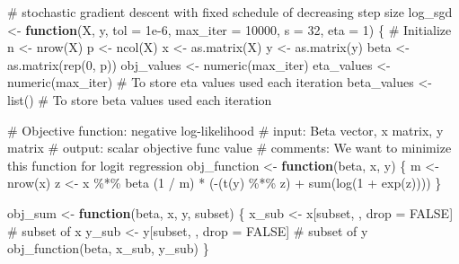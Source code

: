 \documentclass[
  letterpaper,
  DIV=11,
  numbers=noendperiod]{scrartcl}
\newenvironment{Shaded}{\begin{snugshade}}{\end{snugshade}}
\newcommand{\AttributeTok}[1]{\textcolor[rgb]{0.40,0.45,0.13}{#1}}
\newcommand{\CommentTok}[1]{\textcolor[rgb]{0.37,0.37,0.37}{#1}}
\newcommand{\ConstantTok}[1]{\textcolor[rgb]{0.56,0.35,0.01}{#1}}
\newcommand{\ControlFlowTok}[1]{\textcolor[rgb]{0.00,0.23,0.31}{\textbf{#1}}}
\newcommand{\DecValTok}[1]{\textcolor[rgb]{0.68,0.00,0.00}{#1}}
\newcommand{\FloatTok}[1]{\textcolor[rgb]{0.68,0.00,0.00}{#1}}
\newcommand{\FunctionTok}[1]{\textcolor[rgb]{0.28,0.35,0.67}{#1}}
\newcommand{\NormalTok}[1]{\textcolor[rgb]{0.00,0.23,0.31}{#1}}
\newcommand{\OtherTok}[1]{\textcolor[rgb]{0.00,0.23,0.31}{#1}}
\newcommand{\SpecialCharTok}[1]{\textcolor[rgb]{0.37,0.37,0.37}{#1}}
\begin{document}
\begin{Shaded}
\begin{Highlighting}[]
\CommentTok{\# stochastic gradient descent with fixed schedule of decreasing step size}
\NormalTok{log\_sgd }\OtherTok{\textless{}{-}} \ControlFlowTok{function}\NormalTok{(X, y, }\AttributeTok{tol =} \FloatTok{1e{-}6}\NormalTok{, }\AttributeTok{max\_iter =} \DecValTok{10000}\NormalTok{, }\AttributeTok{s =} \DecValTok{32}\NormalTok{, }\AttributeTok{eta =} \DecValTok{1}\NormalTok{) \{}
  \CommentTok{\# Initialize}
\NormalTok{  n }\OtherTok{\textless{}{-}} \FunctionTok{nrow}\NormalTok{(X)}
\NormalTok{  p }\OtherTok{\textless{}{-}} \FunctionTok{ncol}\NormalTok{(X)}
\NormalTok{  x }\OtherTok{\textless{}{-}} \FunctionTok{as.matrix}\NormalTok{(X)}
\NormalTok{  y }\OtherTok{\textless{}{-}} \FunctionTok{as.matrix}\NormalTok{(y)}
\NormalTok{  beta }\OtherTok{\textless{}{-}} \FunctionTok{as.matrix}\NormalTok{(}\FunctionTok{rep}\NormalTok{(}\DecValTok{0}\NormalTok{, p))}
\NormalTok{  obj\_values }\OtherTok{\textless{}{-}} \FunctionTok{numeric}\NormalTok{(max\_iter)}
\NormalTok{  eta\_values }\OtherTok{\textless{}{-}} \FunctionTok{numeric}\NormalTok{(max\_iter)  }\CommentTok{\# To store eta values used each iteration}
\NormalTok{  beta\_values }\OtherTok{\textless{}{-}} \FunctionTok{list}\NormalTok{() }\CommentTok{\# To store beta values used each iteration}
  
  \CommentTok{\# Objective function: negative log{-}likelihood}
  \CommentTok{\# input: Beta vector, x matrix, y matrix}
  \CommentTok{\# output: scalar objective func value}
  \CommentTok{\# comments: We want to minimize this function for logit regression}
\NormalTok{  obj\_function }\OtherTok{\textless{}{-}} \ControlFlowTok{function}\NormalTok{(beta, x, y) \{}
\NormalTok{    m }\OtherTok{\textless{}{-}} \FunctionTok{nrow}\NormalTok{(x)}
\NormalTok{    z }\OtherTok{\textless{}{-}}\NormalTok{ x }\SpecialCharTok{\%*\%}\NormalTok{ beta}
\NormalTok{    (}\DecValTok{1} \SpecialCharTok{/}\NormalTok{ m) }\SpecialCharTok{*}\NormalTok{ (}\SpecialCharTok{{-}}\NormalTok{(}\FunctionTok{t}\NormalTok{(y) }\SpecialCharTok{\%*\%}\NormalTok{ z) }\SpecialCharTok{+} \FunctionTok{sum}\NormalTok{(}\FunctionTok{log}\NormalTok{(}\DecValTok{1} \SpecialCharTok{+} \FunctionTok{exp}\NormalTok{(z))))}
\NormalTok{  \}}
  
\NormalTok{  obj\_sum }\OtherTok{\textless{}{-}} \ControlFlowTok{function}\NormalTok{(beta, x, y, subset) \{}
\NormalTok{    x\_sub }\OtherTok{\textless{}{-}}\NormalTok{ x[subset, , drop }\OtherTok{=} \ConstantTok{FALSE}\NormalTok{]   }\CommentTok{\# subset of x}
\NormalTok{    y\_sub }\OtherTok{\textless{}{-}}\NormalTok{ y[subset, , drop }\OtherTok{=} \ConstantTok{FALSE}\NormalTok{]   }\CommentTok{\# subset of y}
    \FunctionTok{obj\_function}\NormalTok{(beta, x\_sub, y\_sub)}
\NormalTok{  \}}
  

\end{Highlighting}
\end{Shaded}
\end{document}
